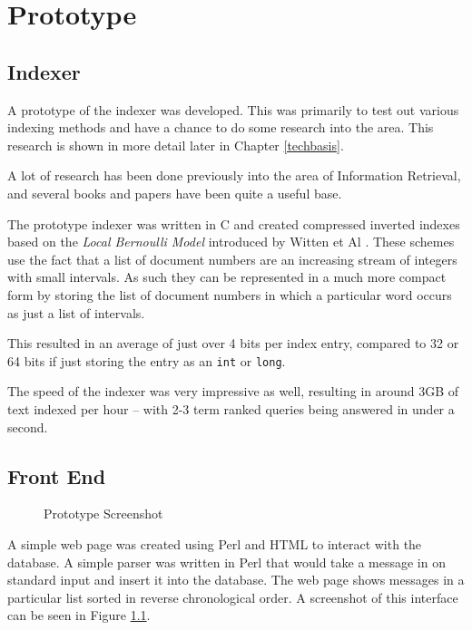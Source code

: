 
\chapter{Prototype}

\section{Indexer}
A prototype of the indexer was developed.  This was primarily to test out various indexing methods and have a chance to do some research into the area.  This research is shown in more detail later in Chapter \ref{techbasis}.

A lot of research has been done previously into the area of Information Retrieval, and several books \cite{wmb:mg, BasRib} and papers have been quite a useful base.

The prototype indexer was written in C and created compressed inverted indexes based on the \emph{Local Bernoulli Model} introduced by Witten et Al \cite{wmb:mg}.  These schemes use the fact that a list of document numbers are an increasing stream of integers with small intervals.  As such they can be represented in a much more compact form by storing the list of document numbers in which a particular word occurs as just a list of intervals.

This resulted in an average of just over 4 bits per index entry, compared to 32 or 64 bits if just storing the entry as an \texttt{int} or \texttt{long}.

The speed of the indexer was very impressive as well, resulting in around 3GB of text indexed per hour --  with 2-3 term ranked queries being answered in under a second.


\section{Front End}

\begin{figure}[!ht]
  \begin{center}
    \caption{Prototype Screenshot}
    \label{fig:screen1}
  \end{center}
\end{figure}

A simple web page was created using Perl and HTML to interact with the database.  A simple parser was written in Perl that would take a message in on standard input and insert it into the database.  The web page shows messages in a particular list sorted in reverse chronological order.  A screenshot of this interface can be seen in Figure \ref{fig:screen1}.

